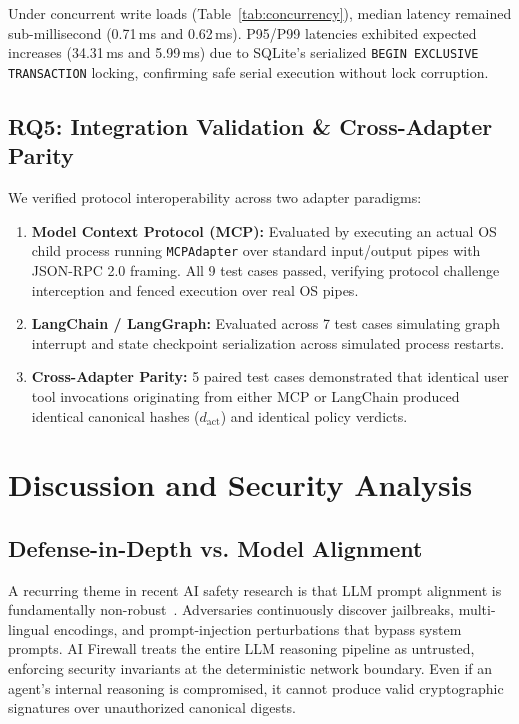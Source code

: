 \documentclass[sigconf,anonymous,review]{acmart}
\begin{document}
Under concurrent write loads (Table~\ref{tab:concurrency}), median latency remained sub-millisecond (0.71\,ms and 0.62\,ms). P95/P99 latencies exhibited expected increases (34.31\,ms and 5.99\,ms) due to SQLite's serialized \texttt{BEGIN EXCLUSIVE TRANSACTION} locking, confirming safe serial execution without lock corruption.

\subsection{RQ5: Integration Validation \& Cross-Adapter Parity}
We verified protocol interoperability across two adapter paradigms:
\begin{enumerate}
    \item \textbf{Model Context Protocol (MCP):} Evaluated by executing an actual OS child process running \texttt{MCPAdapter} over standard input/output pipes with JSON-RPC 2.0 framing. All 9 test cases passed, verifying protocol challenge interception and fenced execution over real OS pipes.
    \item \textbf{LangChain / LangGraph:} Evaluated across 7 test cases simulating graph interrupt and state checkpoint serialization across simulated process restarts.
    \item \textbf{Cross-Adapter Parity:} 5 paired test cases demonstrated that identical user tool invocations originating from either MCP or LangChain produced identical canonical hashes ($d_{\text{act}}$) and identical policy verdicts.
\end{enumerate}

\section{Discussion and Security Analysis}

\subsection{Defense-in-Depth vs. Model Alignment}
A recurring theme in recent AI safety research is that LLM prompt alignment is fundamentally non-robust~\cite{greshake2023not, debenedetti2024agentdojo}. Adversaries continuously discover jailbreaks, multi-lingual encodings, and prompt-injection perturbations that bypass system prompts. AI Firewall treats the entire LLM reasoning pipeline as untrusted, enforcing security invariants at the deterministic network boundary. Even if an agent's internal reasoning is compromised, it cannot produce valid cryptographic signatures over unauthorized canonical digests.
\end{document}
